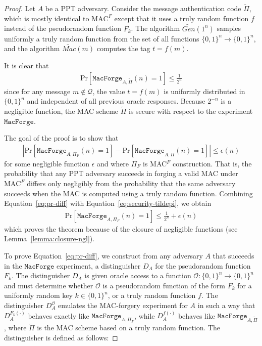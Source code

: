 \begin{proof}\label{proof:handwavy}
Let $A$ be a PPT adversary. Consider the message authentication code $\widetilde{\Pi}$, which is mostly identical to $\mathrm{MAC}^F$ except that it uses a truly random function $f$ instead of the pseudorandom function $F_k$. The algorithm $\widetilde{Gen}(1^n)$ samples uniformly a truly random function from the set of all functions $\{0,1\}^n \to \{0,1\}^n$, and the algorithm $\widetilde{Mac}(m)$ computes the tag $t = f(m)$.

It is clear that
\begin{align}\label{eq:security-tildepi}
\mathrm{Pr}[\mathtt{MacForge}_{A,\widetilde{\Pi}}(n) = 1] \leq \frac{1}{2^n}
\end{align}
since for any message $m \notin \mathcal{Q}$, the value $t = f(m)$ is uniformly distributed in $\{0,1\}^n$ and independent of all previous oracle responses. Because $2^{-n}$ is a negligible function, the MAC scheme $\widetilde{\Pi}$ is secure with respect to the experiment $\mathtt{MacForge}$.

The goal of the proof is to show that
\begin{align}\label{eq:pr-diff}
\left| \mathrm{Pr}[\mathtt{MacForge}_{A,\Pi_F}(n) = 1] - \mathrm{Pr}[\mathtt{MacForge}_{A,\widetilde{\Pi}}(n) = 1] \right| \leq \epsilon(n)
\end{align}
for some negligible function $\epsilon$ and where $\Pi_F$ is MAC$^F$ construction. That is, the probability that any PPT adversary succeeds in forging a valid MAC under $\mathrm{MAC}^F$ differs only negligibly from the probability that the same adversary succeeds when the MAC is computed using a truly random function. Combining Equation~\ref{eq:pr-diff} with Equation~\ref{eq:security-tildepi}, we obtain
\begin{align}\label{eq:security-macf}
\mathrm{Pr}[\mathtt{MacForge}_{A,\Pi_F}(n) = 1] \leq \frac{1}{2^n} + \epsilon(n)
\end{align}
which proves the theorem because of the closure of negligible functions (see Lemma~\ref{lemma:closure-ngl}).

To prove Equation~\ref{eq:pr-diff}, we construct from any adversary $A$ that succeeds in the $\mathtt{MacForge}$ experiment, a distinguisher $D_A$ for the pseudorandom function $F_k$. The distinguisher $D_A$ is given oracle access to a function $\mathcal{O}: \{0,1\}^n \to \{0,1\}^n$ and must determine whether $\mathcal{O}$ is a pseudorandom function of the form $F_k$ for a uniformly random key $k \in \{0,1\}^n$, or a truly random function $f$. The distinguisher $D_A^{\mathcal{O}}$ emulates the MAC-forgery experiment for $A$ in such a way that $D_A^{F_k(\cdot)}$ behaves exactly like $\mathtt{MacForge}_{A,\Pi_F}$, while $D_A^{f(\cdot)}$ behaves like $\mathtt{MacForge}_{A,\widetilde{\Pi}}$, where $\widetilde{\Pi}$ is the MAC scheme based on a truly random function. The distinguisher is defined as follows:


\end{proof}
